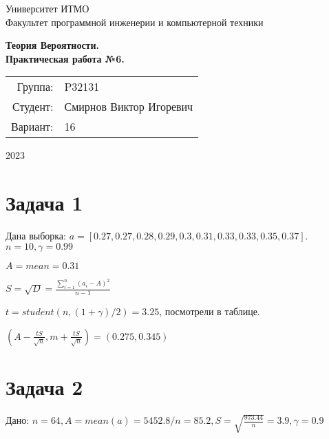 \documentclass{article}
\begin{document}
\begin{titlepage}
    \begin{center}
        \begin{spacing}{1.4}
            \large{Университет ИТМО} \\
            \large{Факультет программной инженерии и компьютерной техники} \\
        \end{spacing}
        \vfill
        \textbf{
            \huge{Теория Вероятности.} \\
            \huge{Практическая работа №6.} \\
        }
    \end{center}
    \vfill
    \begin{center}
        \begin{tabular}{r l}
            Группа:  & P32131                  \\
            Студент: & Смирнов Виктор Игоревич \\
            Вариант: & 16                      \\
        \end{tabular}
    \end{center}
    \vfill
    \begin{center}
        \begin{large}
            2023
        \end{large}
    \end{center}
\end{titlepage}

\section{Задача 1}

Дана выборка: $a = [0.27, 0.27, 0.28, 0.29, 0.3, 0.31, 0.33, 0.33, 0.35, 0.37]$.
$n = 10, \gamma = 0.99$

$A = mean = 0.31$

$S = \sqrt{D} = \frac{\sum_{i=1}^n(a_i - A)^2}{n - 1}$

$t = student(n, (1 + \gamma) / 2) = 3.25$, посмотрели в таблице.

$(A - \frac{tS}{\sqrt{n}}, m + \frac{tS}{\sqrt{n}}) = (0.275, 0.345)$

\section{Задача 2}

Дано: $
n = 64, 
A = mean(a) = 5452.8 / n = 85.2, 
S = \sqrt{\frac{973.44}{n}} = 3.9,
\gamma = 0.9
$
\end{document}
